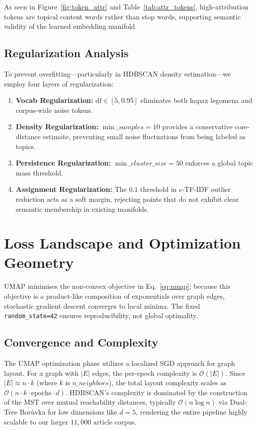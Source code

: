 \documentclass[10pt,twocolumn,a4paper]{article}
\begin{document}
As seen in Figure~\ref{fig:token_attr} and Table~\ref{tab:attr_tokens}, high-attribution tokens are topical content words rather than stop words, supporting semantic validity of the learned embedding manifold.

\subsection{Regularization Analysis}
\label{sec:regularization}

To prevent overfitting—particularly in HDBSCAN density estimation—we employ four layers of regularization:
\begin{enumerate}[leftmargin=*,noitemsep]
\item \textbf{Vocab Regularization:} $\text{df} \in [5, 0.95]$ eliminates both hapax legomena and corpus-wide noise tokens.
\item \textbf{Density Regularization:} $\min\_samples=10$ provides a conservative core-distance estimate, preventing small noise fluctuations from being labeled as topics.
\item \textbf{Persistence Regularization:} $\min\_cluster\_size=50$ enforces a global topic mass threshold.
\item \textbf{Assignment Regularization:} The $0.1$ threshold in c-TF-IDF outlier reduction acts as a soft margin, rejecting points that do not exhibit clear semantic membership in existing manifolds.
\end{enumerate}

\section{Loss Landscape and Optimization Geometry}
\label{sec:loss_landscape}

UMAP minimises the non-convex objective in Eq.~\eqref{eq:umap}; because this objective is a product-like composition of exponentials over graph edges, stochastic gradient descent converges to local minima. The fixed \texttt{random\_state=42} ensures reproducibility, not global optimality.

\subsection{Convergence and Complexity}
\label{sec:convergence}

The UMAP optimization phase utilizes a localized SGD approach for graph layout. For a graph with $|E|$ edges, the per-epoch complexity is $\mathcal{O}(|E|)$. Since $|E| \approx n \cdot k$ (where $k$ is $n\_neighbors$), the total layout complexity scales as $\mathcal{O}(n \cdot k \cdot \text{epochs} \cdot d)$. HDBSCAN's complexity is dominated by the construction of the MST over mutual reachability distances, typically $\mathcal{O}(n \log n)$ via Dual-Tree Borůvka for low dimensions like $d=5$, rendering the entire pipeline highly scalable to our larger $11{,}000$ article corpus.
\end{document}
